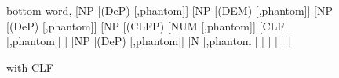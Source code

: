 \documentclass[output=paper,colorlinks,citecolor=brown]{langscibook}
\begin{document}


  \begin{figure}
    \centering
    
		\begin{forest}
		bottom word,
		[NP
		[(DeP) [,phantom]]
			[NP
			[(DEM) [,phantom]]
			[NP
			[(DeP) [,phantom]]
			[NP
			[({CLFP})
			[NUM [,phantom]]
			[{CLF} [,phantom]]
			]
			[NP
			[(DeP) [,phantom]]
			[N [,phantom]]
			]
			]
			]
			]
		]
		\end{forest}
   \caption{ with CLF}
   \label{fig:npwcls:deng}
 \end{figure}

\end{document}

